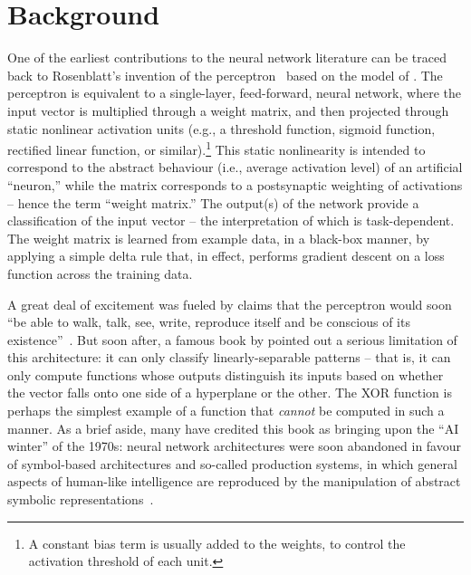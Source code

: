 \chapter{Background}
\label{chapt:background}


One of the earliest contributions to the neural network literature can be traced back to Rosenblatt's invention of the perceptron~\citep{rosenblatt1958perceptron} based on the model of \citet{mcculloch1943logical}.
The perceptron is equivalent to a single-layer, feed-forward, neural network, where the input vector is multiplied through a weight matrix, and then projected through static nonlinear activation units (e.g., a threshold function, sigmoid function, rectified linear function, or similar).\footnote{A constant bias term is usually added to the weights, to control the activation threshold of each unit.}
This static nonlinearity is intended to correspond to the abstract behaviour (i.e., average activation level) of an artificial ``neuron,'' while the matrix corresponds to a postsynaptic weighting of activations -- hence the term ``weight matrix.''
The output(s) of the network provide a classification of the input vector -- the interpretation of which is task-dependent.
The weight matrix is learned from example data, in a black-box manner, by applying a simple delta rule that, in effect, performs gradient descent on a loss function across the training data.

A great deal of excitement was fueled by claims that the perceptron would soon ``be able to walk, talk, see, write, reproduce itself and be conscious of its existence''~\citep{historyofperceptrons}.
But soon after, a famous book by \citet{minsky1969perceptrons} pointed out a serious limitation of this architecture: it can only classify linearly-separable patterns -- that is, it can only compute functions whose outputs distinguish its inputs based on whether the vector falls onto one side of a hyperplane or the other.
The XOR function is perhaps the simplest example of a function that \emph{cannot} be computed in such a manner.
As a brief aside, many have credited this book as bringing upon the ``AI winter'' of the 1970s: neural network architectures were soon abandoned in favour of symbol-based architectures and so-called production systems, in which general aspects of human-like intelligence are reproduced by the manipulation of abstract symbolic representations~\citep{historyofperceptrons, newell1972human}.

